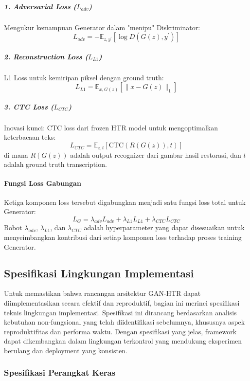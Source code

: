 \documentclass[12pt,a4paper]{article}
\begin{document}
\subparagraph{1. Adversarial Loss ($L_{adv}$)}
Mengukur kemampuan Generator dalam "menipu" Diskriminator:
\begin{equation}
L_{adv} = -\mathbb{E}_{z,y^{\prime}}[\log D(G(z), y^{\prime})]
\end{equation}

\subparagraph{2. Reconstruction Loss ($L_{L1}$)}
L1 Loss untuk kemiripan piksel dengan ground truth:
\begin{equation}
L_{L1} = \mathbb{E}_{x,G(z)}[\|x - G(z)\|_1]
\end{equation}

\subparagraph{3. CTC Loss ($L_{CTC}$)}
Inovasi kunci: CTC loss dari frozen HTR model untuk mengoptimalkan keterbacaan teks:
\begin{equation}
L_{CTC} = \mathbb{E}_{z,t}[\text{CTC}(R(G(z)), t)]
\end{equation}
di mana $R(G(z))$ adalah output recognizer dari gambar hasil restorasi, dan $t$ adalah ground truth transcription.

\paragraph{Fungsi Loss Gabungan}
Ketiga komponen loss tersebut digabungkan menjadi satu fungsi loss total untuk Generator:
\begin{equation}
L_G = \lambda_{adv} L_{adv} + \lambda_{L1} L_{L1} + \lambda_{CTC} L_{CTC}
\end{equation}
Bobot $\lambda_{adv}$, $\lambda_{L1}$, dan $\lambda_{CTC}$ adalah hyperparameter yang dapat disesuaikan untuk menyeimbangkan kontribusi dari setiap komponen loss terhadap proses training Generator.

\subsection{Spesifikasi Lingkungan Implementasi}
\label{subsec:spesifikasi-lingkungan}

Untuk memastikan bahwa rancangan arsitektur GAN-HTR dapat diimplementasikan secara efektif dan reproduktif, bagian ini merinci spesifikasi teknis lingkungan implementasi. Spesifikasi ini dirancang berdasarkan analisis kebutuhan non-fungsional yang telah diidentifikasi sebelumnya, khususnya aspek reproduktifitas dan performa waktu. Dengan spesifikasi yang jelas, framework dapat dikembangkan dalam lingkungan terkontrol yang mendukung eksperimen berulang dan deployment yang konsisten.

\subsubsection{Spesifikasi Perangkat Keras}
\label{subsubsec:hardware-spec}
\end{document}
